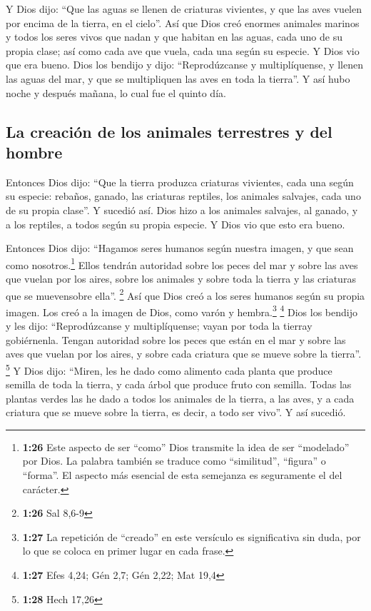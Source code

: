  Y Dios dijo: ``Que las aguas se llenen de criaturas
vivientes, y que las aves vuelen por encima de la tierra, en el cielo''.
 Así que Dios creó enormes animales marinos y todos los
seres vivos que nadan y que habitan en las aguas, cada uno de su propia
clase; así como cada ave que vuela, cada una según su especie. Y Dios
vio que era bueno.  Dios los bendijo y dijo:
``Reprodúzcanse y multiplíquense, y llenen las aguas del mar, y que se
multipliquen las aves en toda la tierra''.  Y así hubo
noche y después mañana, lo cual fue el quinto día.

\hypertarget{la-creaciuxf3n-de-los-animales-terrestres-y-del-hombre}{%
\subsection{La creación de los animales terrestres y del
hombre}\label{la-creaciuxf3n-de-los-animales-terrestres-y-del-hombre}}

 Entonces Dios dijo: ``Que la tierra produzca criaturas
vivientes, cada una según su especie: rebaños, ganado, las criaturas
reptiles, los animales salvajes, cada uno de su propia clase''. Y
sucedió así.  Dios hizo a los animales salvajes, al
ganado, y a los reptiles, a todos según su propia especie. Y Dios vio
que esto era bueno.

 Entonces Dios dijo: ``Hagamos seres humanos según
nuestra imagen, y que sean como nosotros.\footnote{\textbf{1:26} Este
  aspecto de ser ``como'' Dios transmite la idea de ser ``modelado'' por
  Dios. La palabra también se traduce como ``similitud'', ``figura'' o
  ``forma''. El aspecto más esencial de esta semejanza es seguramente el
  del carácter.} Ellos tendrán autoridad sobre los peces del mar y sobre
las aves que vuelan por los aires, sobre los animales y sobre toda la
tierra y las criaturas que se muevensobre ella''. \footnote{\textbf{1:26}
  Sal 8,6-9}  Así que Dios creó a los seres humanos según
su propia imagen. Los creó a la imagen de Dios, como varón y
hembra.\footnote{\textbf{1:27} La repetición de ``creado'' en este
  versículo es significativa sin duda, por lo que se coloca en primer
  lugar en cada frase.} \footnote{\textbf{1:27} Efes 4,24; Gén 2,7; Gén
  2,22; Mat 19,4}  Dios los bendijo y les dijo:
``Reprodúzcanse y multiplíquense; vayan por toda la tierray gobiérnenla.
Tengan autoridad sobre los peces que están en el mar y sobre las aves
que vuelan por los aires, y sobre cada criatura que se mueve sobre la
tierra''. \footnote{\textbf{1:28} Hech 17,26}  Y Dios
dijo: ``Miren, les he dado como alimento cada planta que produce semilla
de toda la tierra, y cada árbol que produce fruto con semilla.
 Todas las plantas verdes las he dado a todos los
animales de la tierra, a las aves, y a cada criatura que se mueve sobre
la tierra, es decir, a todo ser vivo''. Y así sucedió.

